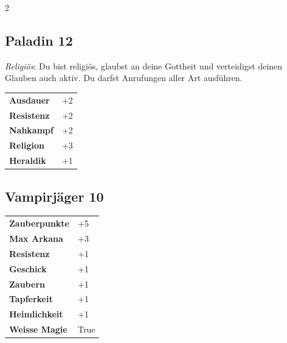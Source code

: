 \begin{multicols}{2}
\begin{tcolorbox}
\end{tcolorbox}

\begin{tcolorbox}
    \subsection*{Paladin \hfill \small{12 }}
    \tcblower
\textit{Religiös}: Du bist religiös, glaubst an deine Gottheit und verteidigst deinen Glauben auch aktiv. Du darfst Anrufungen aller Art ausführen.


\vspace{3mm}

\begin{tabular}{@{}ll@{}}
    \textbf{Ausdauer} & +2\\
    \textbf{Resistenz} & +2\\
    \textbf{Nahkampf} & +2\\
    \textbf{Religion} & +3\\
    \textbf{Heraldik} & +1\\
\end{tabular}


\end{tcolorbox}

\begin{tcolorbox}
    \subsection*{Vampirjäger \hfill \small{10 }}
    \tcblower




\begin{tabular}{@{}ll@{}}
    \textbf{Zauberpunkte} & +5\\
    \textbf{Max Arkana} & +3\\
    \textbf{Resistenz} & +1\\
    \textbf{Geschick} & +1\\
    \textbf{Zaubern} & +1\\
    \textbf{Tapferkeit} & +1\\
    \textbf{Heimlichkeit} & +1\\
    \textbf{Weisse Magie} & True\\
\end{tabular}



\end{tcolorbox}
\end{multicols}
